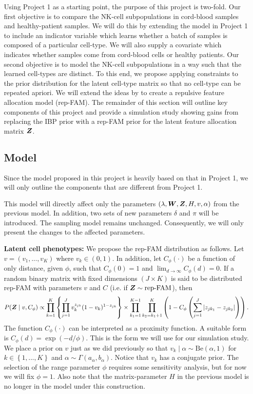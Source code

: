 \documentclass[12pt,]{article}
\newcommand{\p}[1]{\left(#1\right)}
\newcommand{\bc}[1]{ \left\{#1\right\} }
\newcommand{\abs}[1]{ \left|#1\right| }
\def\Be{\text{Be}}
\newcommand{\bZ}{\mbox{\boldmath $Z$}}
\newcommand{\bW}{\mbox{\boldmath $W$}}
\begin{document}
Using Project 1 as a starting point, the purpose of this project is two-fold.
Our first objective is to compare the NK-cell subpopulations in cord-blood
samples and healthy-patient samples. We will do this by extending the model in
Project 1 to include an indicator variable which learns whether a batch of
samples is composed of a particular cell-type. We will also supply a covariate
which indicates whether samples come from cord-blood cells or healthy patients. 
%
Our second objective is to model the NK-cell subpopulations in a way such that
the learned cell-types are distinct. To this end, we propose applying
constraints to the prior distribution for the latent cell-type matrix so that
no cell-type can be repeated apriori. We will extend the ideas by
\cite{petralia2012repulsive} to create a repulsive feature allocation model
(rep-FAM). The remainder of this section will outline key components of this
project and provide a simulation study showing gains from replacing the IBP
prior with a rep-FAM prior for the latent feature allocation matrix $\bZ$.

\subsection{Model}
Since the model proposed in this project is heavily based on that in Project 1,
we will only outline the components that are different from Project 1.

This model will directly affect only the parameters $(\lambda, \bW, \bZ, H, v,
\alpha)$ from the previous model. In addition, two sets of new parameters
$\delta$ and $\pi$ will be introduced. The sampling model remains unchanged.
Consequently, we will only present the changes to the affected parameters. 

\textbf{Latent cell phenotypes:} We propose the rep-FAM distribution as
follows.  Let $v = (v_1, ..., v_K)$ where $v_k \in (0,1)$. In addition, let
$C_\phi(\cdot)$ be a function of only distance, given $\phi$, such that
$C_\phi(0)=1$ and $\lim_{d\rightarrow\infty}C_\phi(d) = 0$. If a random
binary matrix with fixed dimensions $(J\times K)$ is said to be distributed
rep-FAM with parameters $v$ and $C$ (i.e. if $\bZ \sim \text{rep-FAM}$), then
$$
P(\bZ \mid v, C_\phi) \propto \prod_{k=1}^K  \bc{\prod_{j=1}^J v_k^{z_{jk}}(1-v_k)^{1-z_{jk}}} \times
\prod_{k_1=1}^{K-1}\prod_{k_2=k_1+1}^{K} \p{1 - C_\phi\p{\sum_{j=1}^J \abs{z_{jk_1} - z_{jk_2}}}}.
$$
The function $C_\phi(\cdot)$ can be interpreted as a proximity function. A
suitable form is $C_\phi(d) = \exp\p{-d/\phi}$. This is the form we will use
for our simulation study. We place a prior on $v$ just as we did previously so
that $v_k \mid \alpha \sim \Be(\alpha, 1)$ for $k\in\bc{1,...,K}$ and $\alpha
\sim \Gamma(a_\alpha, b_\alpha)$. Notice that $v_k$ has a conjugate prior.  The
selection of the range parameter $\phi$ requires some sensitivity analysis, but
for now we will fix $\phi=1$. Also note that the matrix-parameter $H$ in the
previous model is no longer in the model under this construction.
\end{document}
